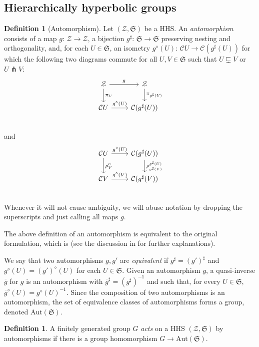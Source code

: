 \documentclass[svgnames]{amsart}
\theoremstyle{plain}
\theoremstyle{definition}
\newtheorem{defn}[thm]{Definition}
\newcommand{\frakS}{\mathfrak S}
\newcommand{\C}{\mathcal C}
\newcommand{\ov}[1]{\overline{#1}}
\newcommand{\propnest}{\sqsubsetneq}
\newcommand{\transverse}{\pitchfork}
\newcommand{\cuco}[1]{{\mathcal #1}}
\begin{document}
\subsection{Hierarchically hyperbolic groups}
\begin{defn}[Automorphism]\label{defn:auto}
Let $({\cuco Z},\frakS)$ be a HHS. An \emph{automorphism} consists of a map $g:\,{\cuco Z}\to {\cuco Z}$, a bijection $g^\sharp:\, \frakS\to \frakS$ preserving nesting and orthogonality, and, for each $U\in\frakS$, an isometry $g^\diamond(U):\,\C  U\to \C (g^\sharp(U))$ for which the following two diagrams commute for all $U,V\in\frakS$ such that $U\propnest V$ or $U\transverse V$:
$$\begin{tikzcd}
{\cuco Z}\ar{r}{g}\ar{d}{\pi_U}&{\cuco Z}\ar{d}{\pi_{g^\sharp (U)}}\\
\C  U\ar{r}{g^\diamond (U)}&\C  (g^\sharp (U))\\
\end{tikzcd}$$
and
$$\begin{tikzcd}
\C  U\ar{r}{g^\diamond (U)}\ar{d}{\rho^U_V}&\C  (g^\sharp (U))\ar{d}{\rho^{g^\sharp (U)}_{g^\sharp (V)}}\\
\C  V\ar{r}{g^\diamond (V)}&\C  (g^\sharp (V))\\
\end{tikzcd}$$
Whenever it will not cause ambiguity, we will abuse notation by dropping the superscripts and just calling all maps $g$.
\end{defn}
The above definition of an automorphism is equivalent to the original formulation, which is \cite[Definition 1.20]{HHS_II} (see the discussion in \cite[Section 2.1]{DHScorrection} for further explanations).

We say that two automorphisms $g,g'$ are \emph{equivalent} if $g^\sharp=(g')^\sharp$ and $g^\diamond(U)=(g')^\diamond(U)$ for each $U\in\frakS$.  Given an automorphism $g$, a quasi-inverse $\ov{g}$ for $g$ is an automorphism with $\ov{g}^\sharp=(g^\sharp)^{-1}$ and such that, for every $U\in \frakS$, $\ov{g}^\diamond(U)=g^\diamond(U)^{-1}$. Since the composition of two automorphisms is an automorphism, the set of equivalence classes of automorphisms forms a group, denoted $\text{Aut}(\frakS)$.

\begin{defn}\label{defn:action_on_hhs}
    A finitely generated group $G$ \emph{acts} on a HHS $({\cuco Z},\frakS)$ by automorphisms if there is a group homomorphism $G\to \text{Aut}(\frakS)$.
\end{defn}
\end{document}

